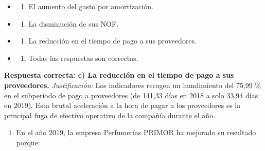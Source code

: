 \documentclass[12pt]{book} %
\providecommand{\tightlist}{%
  \setlength{\itemsep}{0pt}\setlength{\parskip}{0pt}}
\begin{document}
\begin{itemize}
\item
  \begin{enumerate}
  \def\labelenumi{\alph{enumi})}
  \tightlist
  \item
    El aumento del gasto por amortización.
  \end{enumerate}
\item
  \begin{enumerate}
  \def\labelenumi{\alph{enumi})}
  \setcounter{enumi}{1}
  \tightlist
  \item
    La disminución de sus NOF.
  \end{enumerate}
\item
  \begin{enumerate}
  \def\labelenumi{\alph{enumi})}
  \setcounter{enumi}{2}
  \tightlist
  \item
    La reducción en el tiempo de pago a sus proveedores.
  \end{enumerate}
\item
  \begin{enumerate}
  \def\labelenumi{\alph{enumi})}
  \setcounter{enumi}{3}
  \tightlist
  \item
    Todas las respuestas son correctas.
  \end{enumerate}
\end{itemize}

\textbf{Respuesta correcta: c) La reducción en el tiempo de pago a sus
proveedores.} \emph{Justificación:} Los indicadores recogen un
hundimiento del 75,99 \% en el subperiodo de pago a proveedores (de
141,33 días en 2018 a solo 33,94 días en 2019). Esta brutal aceleración
a la hora de pagar a los proveedores es la principal fuga de efectivo
operativo de la compañía durante el año.

\begin{enumerate}
\def\labelenumi{\arabic{enumi}.}
\setcounter{enumi}{6}
\tightlist
\item
  En el año 2019, la empresa Perfumerías PRIMOR ha mejorado su resultado
  porque:
\end{enumerate}
\end{document}

